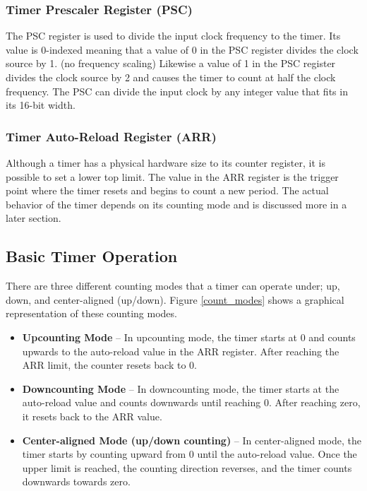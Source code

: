 \documentclass[11pt,fleqn]{book} %
\begin{document}
    \subsubsection{Timer Prescaler Register (PSC)}
    The PSC register is used to divide the input clock frequency to the timer. Its value is 0-indexed meaning that a value of 0 in the PSC register divides the clock source by 1. (no frequency scaling) Likewise a value of 1 in the PSC register divides the clock source by 2 and causes the timer to count at half the clock frequency. The PSC can divide the input clock by any integer value that fits in its 16-bit width.  
    \subsubsection{Timer Auto-Reload Register (ARR)}
     Although a timer has a physical hardware size to its counter register, it is possible to set a lower top limit. The value in the ARR register is the trigger point where the timer resets and begins to count a new period. The actual behavior of the timer depends on its counting mode and is discussed more in a later section. 

    
    \subsection{Basic Timer Operation}
    
    There are three different counting modes that a timer can operate under; up, down, and center-aligned (up/down). Figure \ref{count_modes} shows a graphical representation of these counting modes.  
    
    \begin{itemize}
        \item \textbf{Upcounting Mode} --  In upcounting mode, the timer starts at 0 and counts upwards to the auto-reload value in the ARR register. After reaching the ARR limit, the counter resets back to 0. 
        \item \textbf{Downcounting Mode} -- In downcounting mode, the timer starts at the auto-reload value and counts downwards until reaching 0. After reaching zero, it resets back to the ARR value.
        \item \textbf{Center-aligned Mode (up/down counting)} -- In center-aligned mode, the timer starts by counting upward from 0 until the auto-reload value. Once the upper limit is reached, the counting direction reverses, and the timer counts downwards towards zero.
    \end{itemize}
\end{document}
